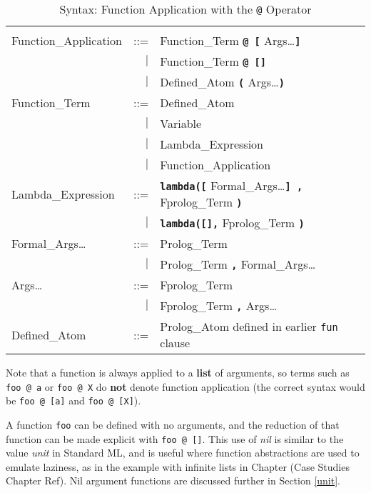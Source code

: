 \documentclass[a4paper,11pt,twoside]{article}
\begin{document}
\begin{table}[htbp]
{\small
\begin{tabular}{| l r l |}
\hline
 & & \\[2mm]
Function\_{}Application & ::= & Function\_{}Term \texttt{\textbf{@ [}} Args\ldots \texttt{\textbf{]}}\\
 & $|$ & Function\_{}Term \texttt{\textbf{@ []}}\\
 & $|$ & Defined\_{}Atom \texttt{\textbf{(}} Args\ldots \texttt{\textbf{)}}\\[4mm]
Function\_{}Term & ::= & Defined\_{}Atom\\
 & $|$ & Variable\\
 & $|$ & Lambda\_{}Expression\\
 & $|$ & Function\_{}Application\\[4mm]
Lambda\_{}Expression & ::= & \texttt{\textbf{lambda([}} Formal\_{}Args\ldots \texttt{\textbf{] ,}}
                                Fprolog\_{}Term \texttt{\textbf{)}}\\
 & $|$ & \texttt{\textbf{lambda([],}} Fprolog\_{}Term \texttt{\textbf{)}}\\[4mm]
Formal\_{}Args\ldots & ::= & Prolog\_{}Term\\
 & $|$ & Prolog\_{}Term \texttt{\textbf{,}} Formal\_{}Args\ldots\\[4mm]
Args\ldots & ::= & Fprolog\_{}Term\\
 & $|$ & Fprolog\_{}Term \texttt{\textbf{,}} Args\ldots\\[4mm]
Defined\_{}Atom & ::= & Prolog\_{}Atom defined in earlier \texttt{fun} clause\\
\hline
\end{tabular}
}
\caption{Syntax: Function Application with the \texttt{@} Operator}
\label{syntax:application}
\end{table}

Note that a function is always applied to a \textbf{list} of arguments,
so terms such as
\texttt{foo @ a} or \texttt{foo @ X}
do \textbf{not} denote function application (the correct syntax would be
\texttt{foo @ [a]} and \texttt{foo @ [X]}).

A function \texttt{foo} can be
defined with no arguments, and the reduction of that function can be made
explicit with \texttt{foo @ []}.  This use of \textit{nil} is similar to
the value \textit{unit} in Standard ML, and is useful where function
abstractions are used to emulate laziness, as in the example with infinite
lists in Chapter (Case Studies Chapter Ref).  Nil argument functions are
discussed further in Section \ref{unit}.
\end{document}
